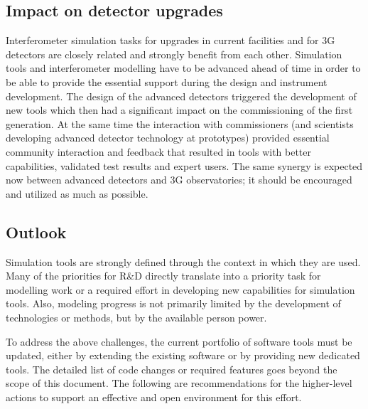 \subsection{Impact on detector upgrades}
Interferometer simulation tasks for upgrades in current facilities and for 3G detectors are closely related and strongly benefit from each other. Simulation tools and interferometer modelling have to be advanced ahead of time in order to be able to provide the essential
support during the design and instrument development. The design of the advanced detectors triggered the development of new tools which then had a significant impact on the commissioning of the first generation. At the same time the interaction with commissioners (and scientists developing advanced detector
technology at prototypes) provided essential community interaction and feedback that resulted in tools with better capabilities, validated test results and expert users. The same synergy is expected now between advanced detectors and 3G observatories; it should be encouraged and utilized as much as possible.

\subsection{Outlook}
Simulation tools are strongly defined through the context in which they are used. Many of the priorities for R\&D directly translate into a priority task for modelling work or a required effort in developing new capabilities for simulation tools. Also, modeling progress is not primarily limited by the development of technologies or methods, but by the available person power.

To address the above challenges, the current portfolio of software tools must be updated, either by extending the existing software or by providing new dedicated tools. The detailed list of code changes or required features goes beyond the scope of this document. The following are recommendations for the higher-level actions to support an effective and open environment for this effort.

